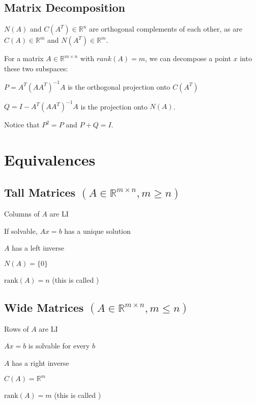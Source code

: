 \documentclass[10pt]{extarticle}
\newcommand{\R}{\mathbb{R}}
\begin{document}
\begin{multicols*}{2}
\subsection{Matrix Decomposition}
$N(A)$ and $C(A^T) \in \R^n$ are orthogonal complements of each other, as are $C(A) \in \R^m$ and $N(A^T) \in \R^m$.

For a matrix  $A \in \R^{m \times n}$ with $rank(A) = m$, we can decompose a point $x$ into these two subspaces:
\begin{compactitem}
	\item $P = A^T(AA^T)^{-1}A$ is the orthogonal projection onto $C(A^T)$
	\item $Q = I - A^T(AA^T)^{-1}A$ is the projection onto $N(A)$.
\end{compactitem}
Notice that $P^2 = P$ and $P + Q = I$.

\section{Equivalences}
\subsection{Tall Matrices $(A \in \R^{m\times n}, m \geq n)$}
\begin{compactenum}
\item Columns of $A$ are LI
\item If solvable, $Ax=b$ has a unique solution
\item $A$ has a left inverse
\item $N(A) = \{0\}$
\item $\text{rank}(A) = n$ (this is called )
\end{compactenum}

\subsection{Wide Matrices $(A \in \R^{m\times n}, m \leq n)$}
\begin{compactenum}
\item Rows of $A$ are LI
\item $Ax=b$ is solvable for every $b$
\item $A$ has a right inverse
\item $C(A) = \R^m$
\item $\text{rank}(A) = m$ (this is called )
\end{compactenum}


\end{multicols*}
\end{document}
